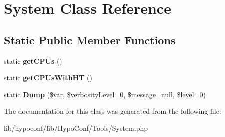 \hypertarget{class_tools_1_1_system}{
\section{\-System \-Class \-Reference}
\label{class_tools_1_1_system}
}
\subsection*{\-Static \-Public \-Member \-Functions}
\begin{DoxyCompactItemize}
\item 
\hypertarget{class_tools_1_1_system_a0c6df9c1d16b7fc304d79092e179fdfe}{
static {\bfseries get\-C\-P\-Us} ()}
\label{class_tools_1_1_system_a0c6df9c1d16b7fc304d79092e179fdfe}

\item 
\hypertarget{class_tools_1_1_system_aa19caed066786d68c85d6fba07477428}{
static {\bfseries get\-C\-P\-Us\-With\-H\-T} ()}
\label{class_tools_1_1_system_aa19caed066786d68c85d6fba07477428}

\item 
\hypertarget{class_tools_1_1_system_a62a5b241f54a51916df3cc3c2a57b44f}{
static {\bfseries \-Dump} (\$var, \$verbosity\-Level=0, \$message=null, \$level=0)}
\label{class_tools_1_1_system_a62a5b241f54a51916df3cc3c2a57b44f}

\end{DoxyCompactItemize}


\-The documentation for this class was generated from the following file\-:\begin{DoxyCompactItemize}
\item 
lib/hypoconf/lib/\-Hypo\-Conf/\-Tools/\-System.\-php\end{DoxyCompactItemize}
